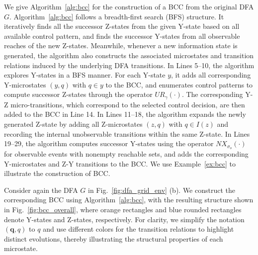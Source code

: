 \documentclass[journal,twoside,web]{ieeecolor}
\begin{document}
%
We give Algorithm~\ref{alg:bcc} for the construction of a BCC from the original DFA $G$.
% 
Algorithm~\ref{alg:bcc} follows a breadth-first search (BFS) structure.
It iteratively finds all the successor Z-states from the given Y-state based on all available control pattern, and finds the successor Y-states from all observable reaches of the new Z-states.
Meanwhile, whenever a new information state is generated, the algorithm also constructs the associated microstates and transition relations induced by the underlying DFA transitions.
%
In Lines 5--10, the algorithm explores Y-states in a BFS manner. For each Y-state $y$, it adds all corresponding Y-microstates $(y,q)$ with $q\in y$ to the BCC, and enumerates control patterns to compute successor Z-states through the operator $UR_\gamma(\cdot)$. 
The corresponding Y-Z micro-transitions, which correspond to the selected control decision, are then added to the BCC in Line 14.
%
In Lines 11--18, the algorithm expands the newly generated Z-state by adding all Z-microstates $(z,q)$ with $q\in I(z)$ and recording the internal unobservable transitions within the same Z-state.
%
In Lines 19--29, the algorithm computes successor Y-states using the operator $NX_{\sigma_o}(\cdot)$ for observable events with nonempty reachable sets, and adds the corresponding Y-microstates and Z-Y transitions to the BCC.
%
We use Example~\ref{ex:bcc} to illustrate the construction of BCC.
%
\begin{example}\label{ex:bcc}
    Consider again the DFA $G$ in Fig.~\ref{fig:dfa_grid_env} (b). 
    We construct the corresponding BCC using Algorithm~\ref{alg:bcc}, with the resulting structure shown in Fig.~\ref{fig:bcc_overall}, where orange rectangles and blue rounded rectangles denote Y-states and Z-states, respectively. 
    For clarity, we simplify the notation $(\bm{q}, q)$ to $q$ and use different colors for the transition relations to highlight distinct evolutions, thereby illustrating the structural properties of each microstate.
\end{example}
\end{document}
